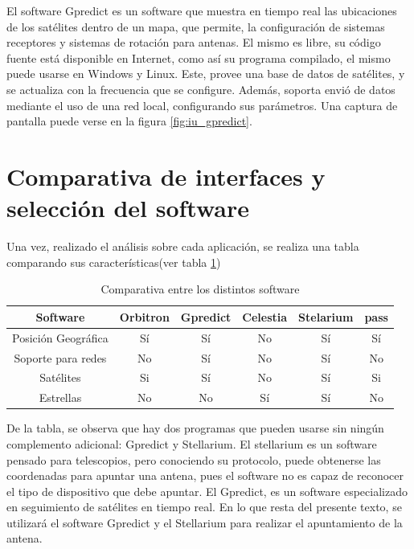 El software Gpredict es un software que muestra en tiempo real las ubicaciones de los satélites dentro de un mapa, que permite, la configuración de sistemas receptores y sistemas de rotación para antenas. El mismo es libre, su código fuente está disponible en Internet, como así su programa compilado, el mismo puede usarse en Windows y Linux. Este, provee una base de datos de satélites, y se actualiza con la frecuencia que se configure. Además, soporta envió de datos mediante el uso de una red local, configurando sus parámetros. Una captura de pantalla puede verse en la figura \ref{fig:iu_gpredict}.



\section{Comparativa de interfaces y selección del software}
Una vez, realizado el análisis sobre cada aplicación, se realiza una tabla comparando sus características(ver tabla \ref{tab:comp_soft})
\begin{table}[h]
	\centering
	\begin{tabular}{|c|c|c|c|c|c|}
		\hline
		Software 			& Orbitron & Gpredict & Celestia & Stelarium & pass\\ 
		\hline
		Posición Geográfica & Sí 	   & Sí 	  & No 		 & Sí        & Sí  \\
		\hline
		Soporte para redes  & No 	   & Sí       & No       & Sí        & No  \\
		\hline
		Satélites 			& Si 	   & Sí		  & No		 & Sí	 & Si  \\
		\hline
		Estrellas 			& No	   & No		  &Sí		 & Sí		 & No  \\
		\hline	
\end{tabular}
\caption{Comparativa entre los distintos software} 
\label{tab:comp_soft}
\end{table}

De la tabla, se observa que hay dos programas que pueden usarse sin ningún complemento adicional: Gpredict y Stellarium. El stellarium es un software pensado para telescopios, pero conociendo su protocolo, puede obtenerse las coordenadas para apuntar una antena, pues el software no es capaz de reconocer el tipo de dispositivo que debe apuntar. El Gpredict, es un software especializado en seguimiento de satélites en tiempo real. En lo que resta del presente texto, se utilizará el software Gpredict y el Stellarium para realizar el apuntamiento de la antena. 
 


